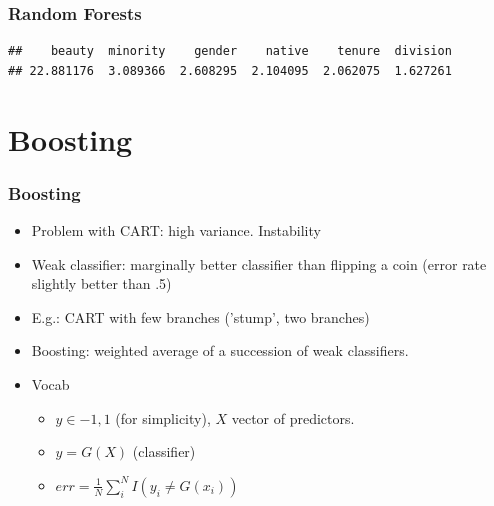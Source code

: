\documentclass[
  shownotes,
  xcolor={svgnames},
  hyperref={colorlinks,citecolor=DarkBlue,linkcolor=DarkRed,urlcolor=DarkBlue}
  , aspectratio=169]{beamer}
\newenvironment{Shaded}{\begin{snugshade}}{\end{snugshade}}
\newcommand{\DataTypeTok}[1]{\textcolor[rgb]{0.13,0.29,0.53}{#1}}
\newcommand{\DecValTok}[1]{\textcolor[rgb]{0.00,0.00,0.81}{#1}}
\newcommand{\KeywordTok}[1]{\textcolor[rgb]{0.13,0.29,0.53}{\textbf{#1}}}
\newcommand{\NormalTok}[1]{#1}
\newcommand{\OperatorTok}[1]{\textcolor[rgb]{0.81,0.36,0.00}{\textbf{#1}}}
\newcommand{\OtherTok}[1]{\textcolor[rgb]{0.56,0.35,0.01}{#1}}
\newcommand{\StringTok}[1]{\textcolor[rgb]{0.31,0.60,0.02}{#1}}
\begin{document}
\begin{frame}[fragile]
\frametitle{Random Forests}

\begin{Shaded}
\end{Shaded}

\begin{verbatim}
##    beauty  minority    gender    native    tenure  division 
## 22.881176  3.089366  2.608295  2.104095  2.062075  1.627261
\end{verbatim}

\end{frame}
\section{Boosting}
\begin{frame}[fragile]
\frametitle{Boosting}

\begin{itemize}
\item Problem with CART: high variance. Instability
\medskip
\item Weak classifier: marginally better classifier than flipping a coin (error rate slightly better than .5)
\medskip
\item E.g.: CART with few branches ('stump', two branches)
\medskip
\item Boosting: weighted average of a succession of weak classifiers.
\medskip
\item Vocab
\medskip
  \begin{itemize}
  \item $y \in {-1,1}$ (for simplicity), $X$ vector of predictors.
  \medskip
  \item $y = G (X)$ (classifier)
  \medskip
  \item $err = \frac{1}{N} \sum_{i}^N I(y_i\neq G(x_i))$
  \end{itemize}
\end{itemize}


\end{frame}
\end{document}
